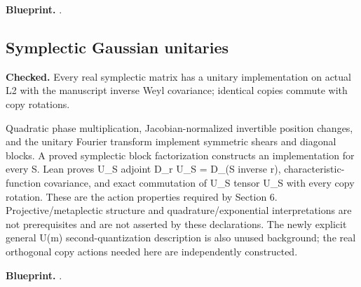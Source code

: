 \textbf{Blueprint.} .

\subsection{Symplectic Gaussian unitaries}\label{paper:boson-symplectic}
\textbf{Checked.} Every real symplectic matrix has a unitary implementation on actual L2 with the manuscript inverse Weyl covariance; identical copies commute with copy rotations. 

Quadratic phase multiplication, Jacobian-normalized invertible position changes, and the unitary Fourier transform implement symmetric shears and diagonal blocks. A proved symplectic block factorization constructs an implementation for every S. Lean proves U\_S adjoint D\_r U\_S = D\_(S inverse r), characteristic-function covariance, and exact commutation of U\_S tensor U\_S with every copy rotation. These are the action properties required by Section 6. Projective/metaplectic structure and quadrature/exponential interpretations are not prerequisites and are not asserted by these declarations. The newly explicit general U(m) second-quantization description is also unused background; the real orthogonal copy actions needed here are independently constructed.


\textbf{Blueprint.} .

